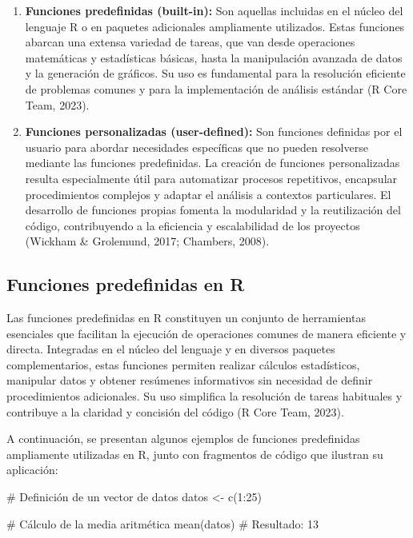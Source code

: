 \documentclass[
  spanish,
  a4paper,
  DIV=11,
  numbers=noendperiod,
  onepage,
  openany]{scrreprt}
\newenvironment{Shaded}{\begin{snugshade}}{\end{snugshade}}
\newcommand{\CommentTok}[1]{\textcolor[rgb]{0.37,0.37,0.37}{#1}}
\newcommand{\DecValTok}[1]{\textcolor[rgb]{0.68,0.00,0.00}{#1}}
\newcommand{\FunctionTok}[1]{\textcolor[rgb]{0.28,0.35,0.67}{#1}}
\newcommand{\NormalTok}[1]{\textcolor[rgb]{0.00,0.23,0.31}{#1}}
\newcommand{\OtherTok}[1]{\textcolor[rgb]{0.00,0.23,0.31}{#1}}
\newcommand{\SpecialCharTok}[1]{\textcolor[rgb]{0.37,0.37,0.37}{#1}}
\begin{document}
\begin{enumerate}
\def\labelenumi{\arabic{enumi}.}
\item
  \textbf{Funciones predefinidas (built-in):} Son aquellas incluidas en
  el núcleo del lenguaje R o en paquetes adicionales ampliamente
  utilizados. Estas funciones abarcan una extensa variedad de tareas,
  que van desde operaciones matemáticas y estadísticas básicas, hasta la
  manipulación avanzada de datos y la generación de gráficos. Su uso es
  fundamental para la resolución eficiente de problemas comunes y para
  la implementación de análisis estándar (R Core Team, 2023).
\item
  \textbf{Funciones personalizadas (user-defined):} Son funciones
  definidas por el usuario para abordar necesidades específicas que no
  pueden resolverse mediante las funciones predefinidas. La creación de
  funciones personalizadas resulta especialmente útil para automatizar
  procesos repetitivos, encapsular procedimientos complejos y adaptar el
  análisis a contextos particulares. El desarrollo de funciones propias
  fomenta la modularidad y la reutilización del código, contribuyendo a
  la eficiencia y escalabilidad de los proyectos (Wickham \& Grolemund,
  2017; Chambers, 2008).
\end{enumerate}

\subsection{Funciones predefinidas en
R}\label{funciones-predefinidas-en-r}

Las funciones predefinidas en R constituyen un conjunto de herramientas
esenciales que facilitan la ejecución de operaciones comunes de manera
eficiente y directa. Integradas en el núcleo del lenguaje y en diversos
paquetes complementarios, estas funciones permiten realizar cálculos
estadísticos, manipular datos y obtener resúmenes informativos sin
necesidad de definir procedimientos adicionales. Su uso simplifica la
resolución de tareas habituales y contribuye a la claridad y concisión
del código (R Core Team, 2023).

A continuación, se presentan algunos ejemplos de funciones predefinidas
ampliamente utilizadas en R, junto con fragmentos de código que ilustran
su aplicación:

\begin{Shaded}
\begin{Highlighting}[]
\CommentTok{\# Definición de un vector de datos}
\NormalTok{datos }\OtherTok{\textless{}{-}} \FunctionTok{c}\NormalTok{(}\DecValTok{1}\SpecialCharTok{:}\DecValTok{25}\NormalTok{)}

\CommentTok{\# Cálculo de la media aritmética}
\FunctionTok{mean}\NormalTok{(datos)           }\CommentTok{\# Resultado: 13}
\end{Highlighting}
\end{Shaded}
\end{document}
